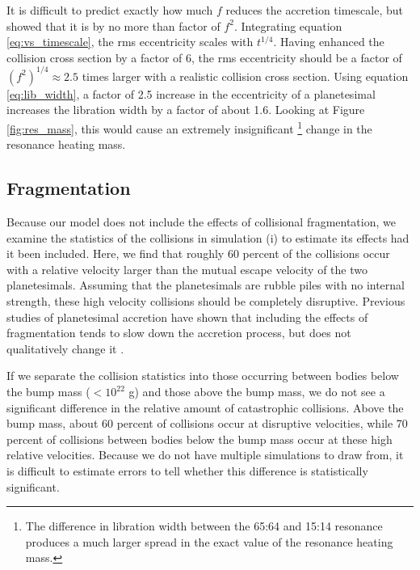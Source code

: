 It is difficult to predict exactly how much $f$ reduces the accretion timescale, but \cite{kokubo96} showed that it is by no more 
than factor of $f^2$. Integrating equation \ref{eq:vs_timescale}, the rms eccentricity scales with $t^{1/4}$. Having enhanced the 
collision cross section by a factor of 6, the rms eccentricity should be a factor of $(f^2)^{1/4} \approx 2.5$ times larger with a 
realistic collision cross section. Using equation \ref{eq:lib_width}, a factor of 2.5 increase in the eccentricity of a planetesimal 
increases the libration width by a factor of about 1.6. Looking at Figure \ref{fig:res_mass}, this would cause an extremely 
insignificant \footnote{The difference in libration width between the 65:64 and 15:14 resonance produces a much larger spread in the exact value of the resonance heating mass.} change in the resonance heating mass.

\subsection{Fragmentation}

Because our model does not include the effects of collisional fragmentation, we examine the statistics of the collisions in 
simulation (i) to estimate its effects had it been included. Here, we find that roughly 60 percent of the collisions occur with a 
relative velocity larger than the mutual escape velocity of the two planetesimals. Assuming that the planetesimals are rubble 
piles with no internal strength, these high velocity collisions should be completely disruptive. Previous studies of planetesimal 
accretion have shown that including the effects of fragmentation tends to slow down the accretion process, but does not 
qualitatively change it \cite{wetherill93, leinhardt05}.

If we separate the collision statistics into those occurring between bodies below the bump mass ($< 10^{22}$ g) and those 
above the bump mass, we do not see a significant difference in the relative amount of catastrophic collisions. Above the bump 
mass, about 60 percent of collisions occur at disruptive velocities, while 70 percent of collisions between bodies below the bump 
mass occur at these high relative velocities. Because we do not have multiple simulations to draw from, it is difficult to estimate 
errors to tell whether this difference is statistically significant.

